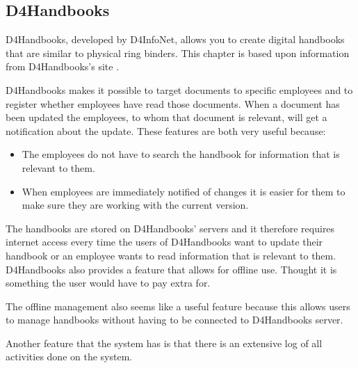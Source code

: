 \subsection{D4Handbooks}

D4Handbooks, developed by D4InfoNet, allows you to create digital handbooks that are similar to physical ring binders.
This chapter is based upon information from D4Handbooks's site \cite{D4Handbook}.

D4Handbooks makes it possible to target documents to specific employees and to register whether employees have read those documents.
When a document has been updated the employees, to whom that document is relevant, will get a notification about the update.
These features are both very useful because:

\begin{itemize}
        \item
        The employees do not have to search the handbook for information that is relevant to them.
        \item
        When employees are immediately notified of changes it is easier for them to make sure they are working with the current version.
\end{itemize}

The handbooks are stored on D4Handbooks' servers and it therefore requires internet access every time the users of D4Handbooks want to update their handbook or an employee wants to read information that is relevant to them.
D4Handbooks also provides a feature that allows for offline use.
Thought it is something the user would have to pay extra for.

The offline management also seems like a useful feature because this allows users to manage handbooks without having to be connected to D4Handbooks server.

Another feature that the system has is that there is an extensive log of all activities done on the system.

